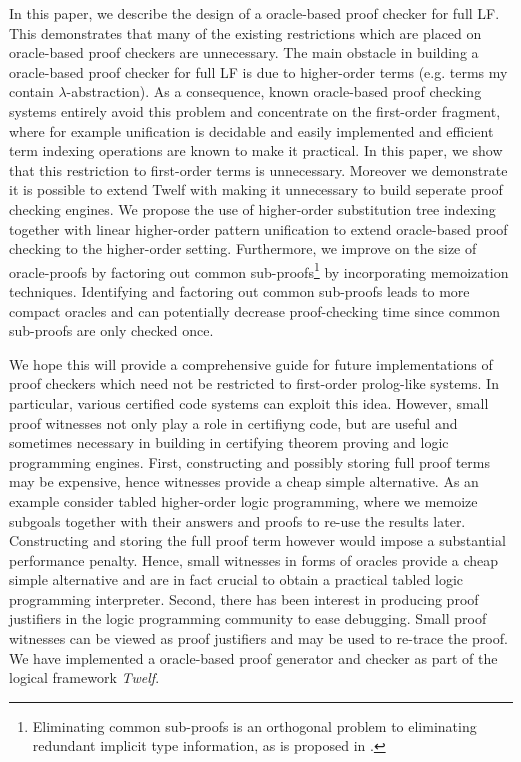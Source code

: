 \documentclass{acmconf}
\begin{document}
In this paper, we describe the design of a oracle-based proof checker for
full LF. This demonstrates that many of the existing restrictions
which are placed on oracle-based proof checkers are unnecessary. The
main obstacle in building a oracle-based proof checker for full LF
is due to higher-order terms (e.g. terms my contain
$\lambda$-abstraction). As a consequence, known oracle-based proof checking
systems entirely avoid this problem and concentrate on the first-order
fragment, where for example unification is decidable and easily
implemented and efficient term indexing operations are known to make
it practical. In this paper, we show that this restriction to
first-order terms is unnecessary. Moreover we demonstrate it is
possible to extend Twelf with making it unnecessary to build seperate
proof checking engines.
We propose the use of higher-order substitution tree indexing together
with linear higher-order pattern unification to extend oracle-based
proof checking to the higher-order setting. Furthermore, we improve on
the size of oracle-proofs by factoring out common
sub-proofs\footnote{Eliminating common sub-proofs   is an orthogonal
  problem to eliminating redundant implicit type 
  information, as is   proposed in \cite{Necula98lics}.} by
incorporating memoization techniques. Identifying and factoring out
common sub-proofs leads to more compact oracles and can potentially
decrease proof-checking time since common sub-proofs are only checked once. 

We hope this will provide a comprehensive guide for future
implementations of proof checkers which need not be restricted to
first-order prolog-like systems. In particular, various
certified code systems can exploit this idea. However, small proof
witnesses not only play a role in certifiyng code, but are useful and
sometimes necessary in building in certifying theorem proving and
logic programming engines. First, constructing and possibly storing
full proof terms may be expensive, hence witnesses provide a cheap
simple alternative. As an example consider tabled higher-order logic
programming, where we memoize subgoals together with their answers and
proofs to re-use the results later. Constructing and storing the full
proof term however would impose a substantial performance
penalty. Hence, small witnesses in forms of oracles  provide a cheap
simple alternative and are in fact crucial to obtain a practical
tabled logic programming interpreter. Second, there has been interest
in producing proof justifiers in the logic programming community to
ease debugging. Small proof witnesses can be viewed as proof
justifiers and may be used to re-trace the proof. We have implemented
a oracle-based proof generator and checker as part of the logical
framework {\em Twelf}.  
\end{document}

